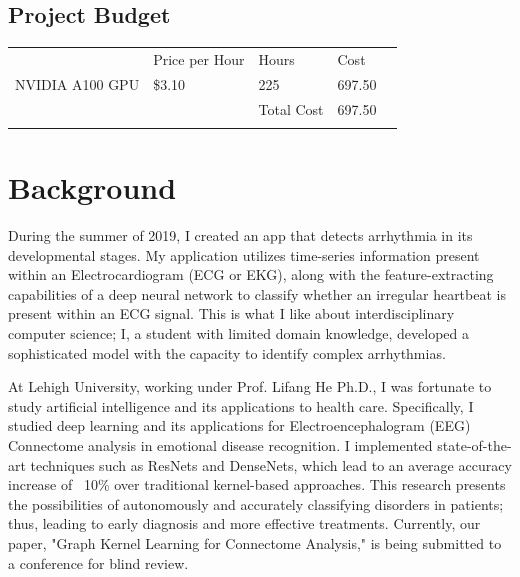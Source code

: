 \documentclass{article}
\begin{document}
\subsection{Project Budget}
\begin{tabular}{lllll}
                & Price per Hour & Hours      & Cost   &  \\
NVIDIA A100 GPU & \$3.10         & 225        & 697.50 &  \\
                &                & Total Cost & 697.50 &  \\
                &                &            &        & 
\end{tabular}

\section{Background}
During the summer of 2019, I created an app that detects arrhythmia in its developmental stages. My application utilizes time-series information present within an Electrocardiogram (ECG or EKG), along with the feature-extracting capabilities of a deep neural network to classify whether an irregular heartbeat is present within an ECG signal. This is what I like about interdisciplinary computer science; I, a student with limited domain knowledge, developed a sophisticated model with the capacity to identify complex arrhythmias.

At Lehigh University, working under Prof. Lifang He Ph.D., I was fortunate to study artificial intelligence and its applications to health care. Specifically, I studied deep learning and its applications for Electroencephalogram (EEG) Connectome analysis in emotional disease recognition. I implemented state-of-the-art techniques such as ResNets and DenseNets, which lead to an average accuracy increase of ~10\% over traditional kernel-based approaches. This research presents the possibilities of autonomously and accurately classifying disorders in patients; thus, leading to early diagnosis and more effective treatments. Currently, our paper, "Graph Kernel Learning for Connectome Analysis," is being submitted to a conference for blind review.


  
\end{document}
